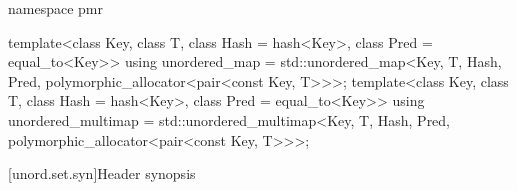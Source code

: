 \begin{codeblock}
{  namespace pmr {
    template<class Key,
             class T,
             class Hash = hash<Key>,
             class Pred = equal_to<Key>>
      using unordered_map =
        std::unordered_map<Key, T, Hash, Pred,
                           polymorphic_allocator<pair<const Key, T>>>;
    template<class Key,
             class T,
             class Hash = hash<Key>,
             class Pred = equal_to<Key>>
      using unordered_multimap =
        std::unordered_multimap<Key, T, Hash, Pred,
                                polymorphic_allocator<pair<const Key, T>>>;

  }
}
\end{codeblock}

[unord.set.syn]{Header  synopsis}%
%
%
%
